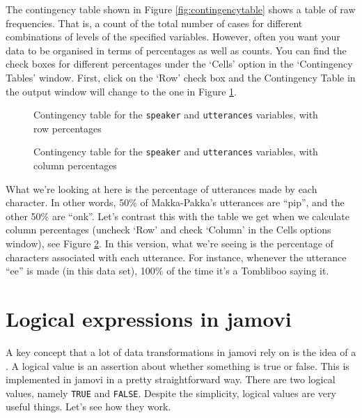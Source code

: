 The contingency table shown in Figure \ref{fig:contingencytable} shows a table of raw frequencies. That is, a count of the total number of cases for different combinations of levels of the specified variables. However, often you want your data to be organised in terms of percentages as well as counts. You can find the check boxes for different percentages under the `Cells' option in the `Contingency Tables' window. First, click on the `Row' check box and the Contingency Table in the output window will change to the one in Figure \ref{fig:contingencyrow}. 

\vspace{0.5cm}
\begin{figure}[!!htb]
\begin{center}
\caption{Contingency table for the \texttt{speaker} and \texttt{utterances} variables, with row percentages}
\label{fig:contingencyrow}
\end{center}
\end{figure}

\begin{figure}[!!htb]
\begin{center}
\caption{Contingency table for the \texttt{speaker} and \texttt{utterances} variables, with column percentages}
\label{fig:contingencycol}
\end{center}
\end{figure}

What we're looking at here is the percentage of utterances made by each character. In other words, 50\% of Makka-Pakka's utterances are ``pip'', and the other 50\% are ``onk''. Let's contrast this with the table we get when we calculate column percentages (uncheck `Row' and check `Column' in the Cells options window), see Figure \ref{fig:contingencycol}. In this version, what we're seeing is the percentage of characters associated with each utterance. For instance, whenever the utterance ``ee'' is made (in this data set), 100\% of the time it's a Tombliboo saying it. 


\section{Logical expressions in jamovi\label{sec:logicals}}

A key concept that a lot of data transformations in jamovi rely on is the idea of a . A logical value is an assertion about whether something is true or false. This is implemented in jamovi in a pretty straightforward way. There are two logical values, namely \texttt{TRUE} and \texttt{FALSE}. Despite the simplicity, logical values are very useful things. Let's see how they work.


